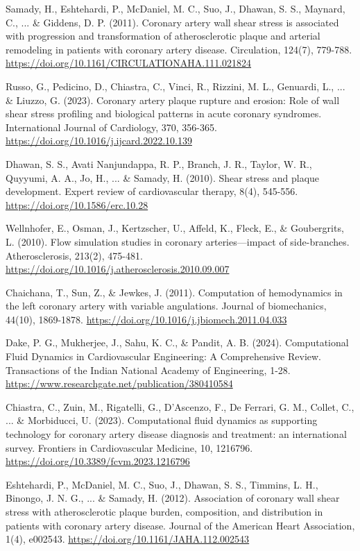 ﻿\documentclass[12pt,a4paper]{article}
\theoremstyle{definition}
\numberwithin{equation}{section}
\begin{document}
\begin{thebibliography}{}
 Samady, H., Eshtehardi, P., McDaniel, M. C., Suo, J., Dhawan, S. S., Maynard, C., ... \& Giddens, D. P. (2011). Coronary artery wall shear stress is associated with progression and transformation of atherosclerotic plaque and arterial remodeling in patients with coronary artery disease. Circulation, 124(7), 779-788. \url{https://doi.org/10.1161/CIRCULATIONAHA.111.021824}

 Russo, G., Pedicino, D., Chiastra, C., Vinci, R., Rizzini, M. L., Genuardi, L., ... \& Liuzzo, G. (2023). Coronary artery plaque rupture and erosion: Role of wall shear stress profiling and biological patterns in acute coronary syndromes. International Journal of Cardiology, 370, 356-365. \url{https://doi.org/10.1016/j.ijcard.2022.10.139}

 Dhawan, S. S., Avati Nanjundappa, R. P., Branch, J. R., Taylor, W. R., Quyyumi, A. A., Jo, H., ... \& Samady, H. (2010). Shear stress and plaque development. Expert review of cardiovascular therapy, 8(4), 545-556. \url{https://doi.org/10.1586/erc.10.28}

 Wellnhofer, E., Osman, J., Kertzscher, U., Affeld, K., Fleck, E., \& Goubergrits, L. (2010). Flow simulation studies in coronary arteries—impact of side-branches. Atherosclerosis, 213(2), 475-481. \url{https://doi.org/10.1016/j.atherosclerosis.2010.09.007}

 Chaichana, T., Sun, Z., \& Jewkes, J. (2011). Computation of hemodynamics in the left coronary artery with variable angulations. Journal of biomechanics, 44(10), 1869-1878. \url{https://doi.org/10.1016/j.jbiomech.2011.04.033}

 Dake, P. G., Mukherjee, J., Sahu, K. C., \& Pandit, A. B. (2024). Computational Fluid Dynamics in Cardiovascular Engineering: A Comprehensive Review. Transactions of the Indian National Academy of Engineering, 1-28. \url{https://www.researchgate.net/publication/380410584}

 Chiastra, C., Zuin, M., Rigatelli, G., D’Ascenzo, F., De Ferrari, G. M., Collet, C., ... \& Morbiducci, U. (2023). Computational fluid dynamics as supporting technology for coronary artery disease diagnosis and treatment: an international survey. Frontiers in Cardiovascular Medicine, 10, 1216796. \url{https://doi.org/10.3389/fcvm.2023.1216796}

 Eshtehardi, P., McDaniel, M. C., Suo, J., Dhawan, S. S., Timmins, L. H., Binongo, J. N. G., ... \& Samady, H. (2012). Association of coronary wall shear stress with atherosclerotic plaque burden, composition, and distribution in patients with coronary artery disease. Journal of the American Heart Association, 1(4), e002543. \url{https://doi.org/10.1161/JAHA.112.002543}


\end{thebibliography}
\end{document}
